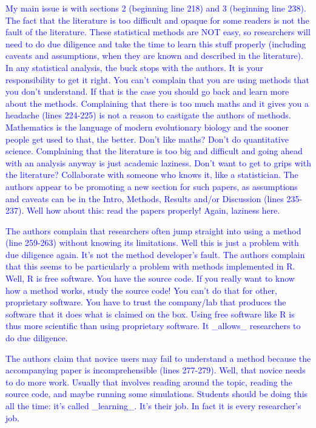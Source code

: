 \documentclass[12pt]{letter}
\begin{document}
\begin{letter}{}
\textcolor{blue}{My main issue is with sections 2 (beginning line 218) and 3 (beginning line 238). The fact that the literature is too difficult and opaque for some readers is not the fault of the literature. These statistical methods are NOT easy, so researchers will need to do due diligence and take the time to learn this stuff properly (including caveats and assumptions, when they are known and described in the literature). In any statistical analysis, the buck stops with the authors. It is your responsibility to get it right. You can't complain that you are using methods that you don't understand. If that is the case you should go back and learn more about the methods. Complaining that there is too much maths and it gives you a headache (lines 224-225) is not a reason to castigate the authors of methods. Mathematics is the language of modern evolutionary biology and the sooner people get used to that, the better. Don't like maths? Don't do quantitative science. Complaining that the literature is too big and difficult and going ahead with an analysis anyway is just academic laziness. Don't want to get to grips with the literature? Collaborate with someone who knows it, like a statistician. The authors appear to be promoting a new section for such papers, as assumptions and caveats can be in the Intro, Methods, Results and/or Discussion (lines 235-237). Well how about this: read the papers properly! Again, laziness here.}

\textcolor{blue}{The authors complain that researchers often jump straight into using a method (line 259-263) without knowing its limitations. Well this is just a problem with due diligence again. It's not the method developer's fault. The authors complain that this seems to be particularly a problem with methods implemented in R. Well, R is free software. You have the source code. If you really want to know how a method works, study the source code! You can't do that for other, proprietary software. You have to trust the company/lab that produces the software that it does what is claimed on the box. Using free software like R is thus more scientific than using proprietary software. It \_allows\_ researchers to do due diligence.}

\textcolor{blue}{The authors claim that novice users may fail to understand a method because the accompanying paper is incomprehensible (lines 277-279). Well, that novice needs to do more work. Usually that involves reading around the topic, reading the source code, and maybe running some simulations. Students should be doing this all the time: it's called \_learning\_. It's their job. In fact it is every researcher's job.}


\end{letter}
\end{document}
